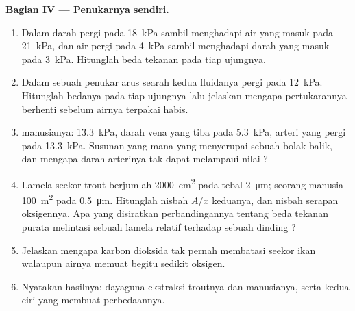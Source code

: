 \begin{problem}
\medskip
\noindent\textbf{Bagian IV --- Penukarnya sendiri.}
\begin{enumerate}[resume]
  \item Dalam   darah pergi pada \qty{18}{kPa}
        sambil menghadapi air yang masuk pada \qty{21}{kPa}, dan air
        pergi pada \qty{4}{kPa} sambil menghadapi darah yang masuk pada
        \qty{3}{kPa}. Hitunglah beda tekanan pada tiap ujungnya.
  \item Dalam sebuah penukar arus searah kedua fluidanya pergi pada
        \qty{12}{kPa}. Hitunglah bedanya pada tiap ujungnya lalu
        jelaskan mengapa pertukarannya berhenti sebelum airnya
        terpakai habis.
  \item {} manusianya:  \qty{13.3}{kPa}, darah vena
        yang tiba pada \qty{5.3}{kPa}, arteri yang pergi pada
        \qty{13.3}{kPa}. Susunan yang mana yang menyerupai sebuah
         bolak-balik, dan mengapa darah arterinya tak dapat
        melampaui nilai ?
  \item Lamela seekor trout berjumlah \qty{2000}{cm^2} pada tebal
        \qty{2}{\micro m};  seorang manusia \qty{100}{m^2} pada
        \qty{0.5}{\micro m}. Hitunglah nisbah $A/x$ keduanya, dan
        nisbah serapan oksigennya. Apa yang disiratkan perbandingannya
        tentang beda tekanan purata melintasi sebuah lamela relatif
        terhadap sebuah dinding ?
  \item Jelaskan mengapa karbon dioksida tak pernah membatasi seekor
        ikan walaupun airnya memuat begitu sedikit oksigen.
  \item Nyatakan hasilnya: dayaguna ekstraksi  troutnya dan
         manusianya, serta kedua ciri  yang membuat
        perbedaannya.
\end{enumerate}
\end{problem}
